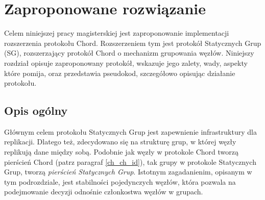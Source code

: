 \documentclass[12pt, twoside, openany]{report}
\begin{document}
\chapter{Zaproponowane rozwiązanie}
\label{rozdzial_rozwiazanie}
Celem niniejszej pracy magisterskiej jest zaproponowanie implementacji rozszerzenia protokołu Chord. Rozszerzeniem tym jest protokół Statycznych Grup (SG), rozszerzający protokół Chord o mechanizm grupowania węzłów. Niniejszy rozdział opisuje zaproponowany protokół, wskazuje jego zalety, wady, aspekty które pomija, oraz przedstawia pseudokod, szczegółowo opisując działanie protokołu.

\section{Opis ogólny}
Głównym celem protokołu Statycznych Grup jest zapewnienie infrastruktury dla replikacji. Dlatego też, zdecydowano się na strukturę grup, w której węzły replikują dane między sobą. Podobnie jak węzły w protokole Chord tworzą pierścień Chord (patrz paragraf \ref{ch_ch_id}), tak grupy w protokole Statycznych Grup, tworzą \textit{pierścień Statycznych Grup}. Istotnym zagadanienim, opisanym w tym podrozdziale, jest stabilności pojedynczych węzłów, która pozwala na podejmowanie decyzji odnośnie członkostwa węzłów w grupach.
\end{document}
